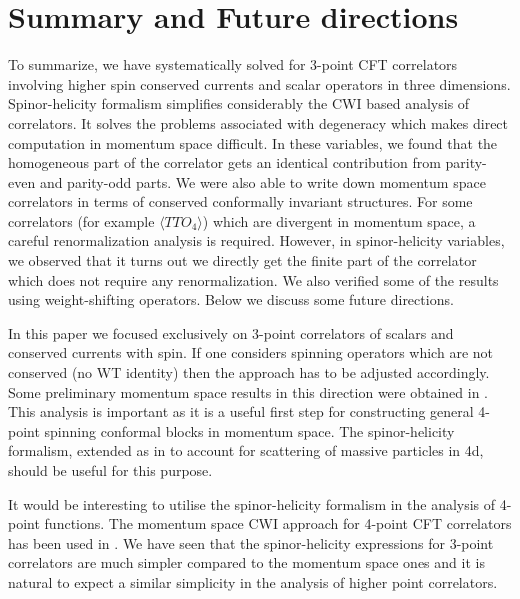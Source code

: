 \documentclass[a4paper,11pt]{article}
\begin{document}
\section{Summary and Future directions}\label{fdir}
To summarize, we have systematically solved for 3-point CFT correlators involving higher spin conserved currents and scalar operators in three dimensions. Spinor-helicity formalism simplifies considerably the CWI based analysis of correlators. It solves the problems associated with degeneracy which makes direct computation in momentum space difficult.  In these variables, we found that the homogeneous part of the correlator gets an identical contribution from parity-even and parity-odd parts. We were also able to write down momentum space correlators in terms of conserved conformally invariant structures. For some correlators (for example $\langle TTO_{4}\rangle $) which are divergent in momentum space, a careful renormalization analysis is required. However, in spinor-helicity variables, we observed that it turns out we directly get the finite part of the correlator which does not require any renormalization. We also verified some of the results using weight-shifting operators. 
Below we discuss some future directions.

In this paper we focused exclusively on 3-point correlators of scalars and conserved currents with spin. If one considers spinning operators which are not conserved (no WT identity) then the approach has to be adjusted accordingly.  Some preliminary momentum space results in this direction were obtained in \cite{Isono:2019ihz}. This analysis is important as it is a useful first step for constructing general 4-point spinning conformal blocks in momentum space. The spinor-helicity formalism,  extended as in \cite{Arkani-Hamed:2017jhn} to account for scattering of massive particles in 4d, should be useful for this purpose. 

It would be interesting to utilise the spinor-helicity formalism in the analysis of 4-point functions. The momentum space CWI approach for 4-point CFT correlators has been used in \cite{Coriano:2019nkw, Maglio:2019grh, Coriano:2020ccb, Coriano:2020ees}. We have seen that the spinor-helicity expressions for 3-point correlators are much simpler compared to the momentum space ones and it is natural to expect a similar simplicity in the analysis of higher point correlators.
\end{document}
